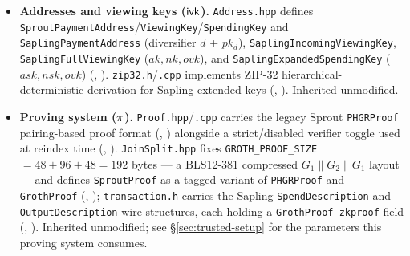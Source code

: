 \begin{itemize}
\item \textbf{Addresses and viewing keys ($\mathsf{ivk}$).} \texttt{Address.hpp} defines
  \texttt{Sprout\allowbreak{}Payment\allowbreak{}Address}\slash\texttt{ViewingKey}\slash\texttt{SpendingKey} and
  \texttt{Sapling\allowbreak{}Payment\allowbreak{}Address} (diversifier $d$ + $pk_d$), \texttt{Sapling\allowbreak{}Incoming\allowbreak{}Viewing\allowbreak{}Key},
  \texttt{Sapling\allowbreak{}Full\allowbreak{}Viewing\allowbreak{}Key} ($ak,nk,ovk$), and \texttt{Sapling\allowbreak{}Expanded\allowbreak{}Spending\allowbreak{}Key}
  ($ask,nsk,ovk$) (\shipped, ).
  \texttt{zip32.h}\slash\texttt{.cpp} implements ZIP-32 hierarchical-deterministic derivation for Sapling
  extended keys (\shipped, ). Inherited unmodified.
\item \textbf{Proving system ($\pi$).} \texttt{Proof.hpp}\slash\texttt{.cpp} carries the legacy Sprout
  \texttt{PHGRProof} pairing-based proof format (\shipped,
  ) alongside a strict/disabled verifier toggle used at
  reindex time (\shipped, ). \texttt{JoinSplit.hpp} fixes
  \texttt{GROTH\_PROOF\_SIZE}$=48+96+48=192$ bytes — a BLS12-381 compressed $G_1\|G_2\|G_1$ layout —
  and defines \texttt{SproutProof} as a tagged variant of \texttt{PHGRProof} and \texttt{GrothProof}
  (\shipped, ); \texttt{transaction.h} carries the
  Sapling \texttt{Spend\allowbreak{}Description} and \texttt{Output\allowbreak{}Description} wire structures, each holding a
  \texttt{Groth\allowbreak{}Proof zkproof} field (\shipped, ).
  Inherited unmodified; see \S\ref{sec:trusted-setup} for the parameters this proving system consumes.
\end{itemize}

